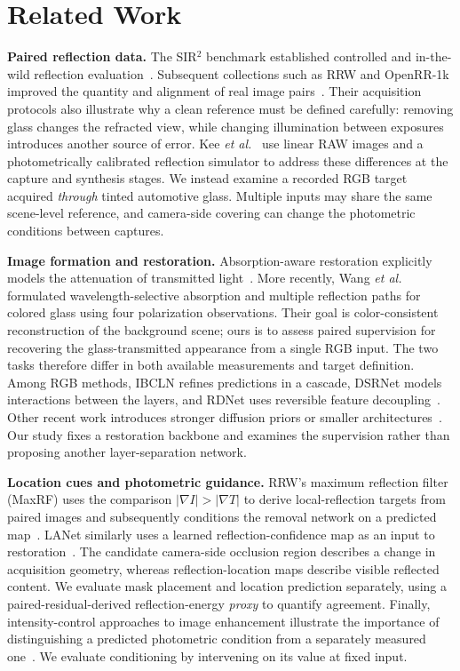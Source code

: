 \section{Related Work}
\label{sec:related}

\textbf{Paired reflection data.}
The SIR$^2$ benchmark established controlled and in-the-wild
reflection evaluation~\cite{wan2017benchmarking}. Subsequent
collections such as RRW and OpenRR-1k improved the quantity and
alignment of real image pairs~\cite{zhu2024rrw,openrr2025}.
Their acquisition protocols also illustrate why a clean reference
must be defined carefully: removing glass changes the refracted
view, while changing illumination between exposures introduces
another source of error. Kee \emph{et al.}~\cite{kee2025raw} use linear
RAW images and a photometrically calibrated reflection simulator
to address these differences at the capture and synthesis stages.
We instead examine a recorded RGB target acquired \emph{through}
tinted automotive glass. Multiple inputs may share the same
scene-level reference, and camera-side covering can change the
photometric conditions between captures.

\textbf{Image formation and restoration.}
Absorption-aware restoration explicitly models the attenuation of
transmitted light~\cite{zheng2021absorption}. More recently,
Wang \emph{et al.}~\cite{wang2026pstm} formulated wavelength-selective
absorption and multiple reflection paths for colored glass using
four polarization observations. Their goal is color-consistent
reconstruction of the background scene; ours is to assess paired
supervision for recovering the glass-transmitted appearance from
a single RGB input. The two tasks therefore differ in both
available measurements and target definition.
Among RGB methods, IBCLN refines predictions in a cascade,
DSRNet models interactions between the layers, and RDNet uses
reversible feature decoupling~\cite{li2020ibcln,hu2023dsrnet,zhao2025rdnet}.
Other recent work introduces stronger diffusion priors or
smaller architectures~\cite{hong2024ldiffer,li2026gensirr,lightrr2026}.
Our study fixes a restoration backbone and examines the
supervision rather than proposing another layer-separation network.

\textbf{Location cues and photometric guidance.}
RRW's maximum reflection filter (MaxRF) uses the comparison
$|\nabla I|>|\nabla T|$ to derive local-reflection targets
from paired images and subsequently conditions the removal network
on a predicted map~\cite{zhu2024rrw}. LANet similarly uses a learned
reflection-confidence map as an input to restoration~\cite{lanet2021}.
The candidate camera-side occlusion region describes a change
in acquisition geometry, whereas reflection-location maps describe
visible reflected content. We evaluate mask placement and
location prediction separately, using a paired-residual-derived
reflection-energy \emph{proxy} to quantify agreement. Finally, intensity-control approaches to
image enhancement illustrate the importance of distinguishing a
predicted photometric condition from a separately measured
one~\cite{guo2020zerodce,cai2023retinexformer}. We evaluate
conditioning by intervening on its value at fixed input.

